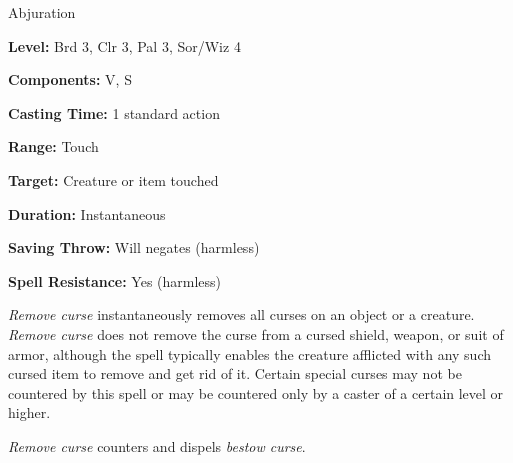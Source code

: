 
Abjuration

\textbf{Level:} Brd 3, Clr 3, Pal 3, Sor/Wiz 4

\textbf{Components:} V, S

\textbf{Casting Time:} 1 standard action

\textbf{Range:} Touch

\textbf{Target:} Creature or item touched

\textbf{Duration:} Instantaneous

\textbf{Saving Throw:} Will negates (harmless)

\textbf{Spell Resistance:} Yes (harmless)

\textit{Remove curse} instantaneously removes all curses on an object or a creature. 
\textit{Remove curse} does not remove the curse from a cursed shield, weapon, or 
suit of armor, although the spell typically enables the creature afflicted with 
any such cursed item to remove and get rid of it. Certain special curses may not 
be countered by this spell or may be countered only by a caster of a certain level 
or higher.

\textit{Remove curse} counters and dispels \textit{bestow curse}.

